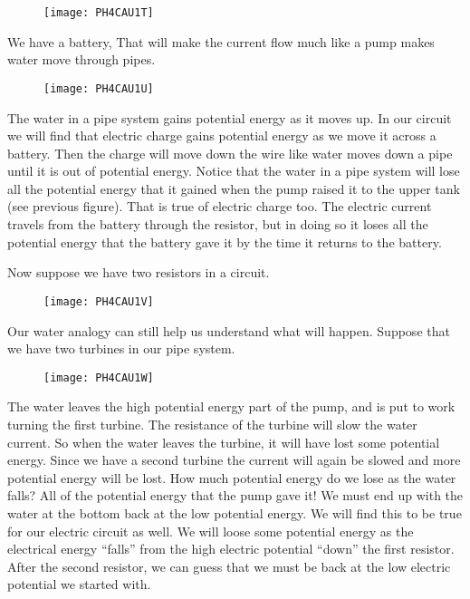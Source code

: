 \begin{figure}[h!]
	\centering
	\texttt{[image: PH4CAU1T]}
\end{figure}

\vspace{1in} %

\noindent We have a battery, That will make the current flow much like a pump makes water move through pipes.

\begin{figure}[h!]
	\centering
	\texttt{[image: PH4CAU1U]}
\end{figure}

The water in a pipe system gains potential energy as it moves up. In our circuit we will find that electric charge gains potential energy as we move it across a battery. Then the charge will move down the wire like water moves down a pipe until it is out of potential energy. Notice that the water in a pipe system will lose all the potential energy that it gained when the pump raised it to the upper tank (see previous figure). That is true of electric charge too. The electric current travels from the battery through the resistor, but in doing so it loses all the potential energy that the battery gave it by the time it returns to the battery.

Now suppose we have two resistors in a circuit.

\begin{figure}[h!]
	\centering
	\texttt{[image: PH4CAU1V]}
\end{figure}

\noindent Our water analogy can still help us understand what will happen. Suppose
that we have two turbines in our pipe system. 

\begin{figure}[h!]
	\centering
	\texttt{[image: PH4CAU1W]}
\end{figure}

The water leaves the high potential energy part of the pump, and is put to work turning the first turbine. The resistance of the turbine will slow the water current. So when the water leaves the turbine, it will have lost some potential energy. Since we have a second turbine the current will again be slowed and more potential energy will be lost. How much potential energy do we lose as the water falls? All of the potential energy that the pump gave it! We must end up with the water at the bottom back at the low potential energy. We will find this to be true for our electric circuit as well. We will loose some potential energy as the electrical energy ``falls'' from the high electric potential ``down'' the first resistor. After the second resistor, we can guess that we must be back at the low electric potential we started with.

